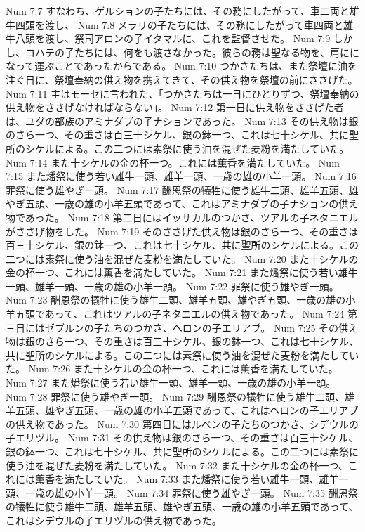 Num 7:7  すなわち、ゲルションの子たちには、その務にしたがって、車二両と雄牛四頭を渡し、
Num 7:8  メラリの子たちには、その務にしたがって車四両と雄牛八頭を渡し、祭司アロンの子イタマルに、これを監督させた。
Num 7:9  しかし、コハテの子たちには、何をも渡さなかった。彼らの務は聖なる物を、肩にになって運ぶことであったからである。
Num 7:10  つかさたちは、また祭壇に油を注ぐ日に、祭壇奉納の供え物を携えてきて、その供え物を祭壇の前にささげた。
Num 7:11  主はモーセに言われた、「つかさたちは一日にひとりずつ、祭壇奉納の供え物をささげなければならない」。
Num 7:12  第一日に供え物をささげた者は、ユダの部族のアミナダブの子ナションであった。
Num 7:13  その供え物は銀のさら一つ、その重さは百三十シケル、銀の鉢一つ、これは七十シケル、共に聖所のシケルによる。この二つには素祭に使う油を混ぜた麦粉を満たしていた。
Num 7:14  また十シケルの金の杯一つ。これには薫香を満たしていた。
Num 7:15  また燔祭に使う若い雄牛一頭、雄羊一頭、一歳の雄の小羊一頭。
Num 7:16  罪祭に使う雄やぎ一頭。
Num 7:17  酬恩祭の犠牲に使う雄牛二頭、雄羊五頭、雄やぎ五頭、一歳の雄の小羊五頭であって、これはアミナダブの子ナションの供え物であった。
Num 7:18  第二日にはイッサカルのつかさ、ツアルの子ネタニエルがささげ物をした。
Num 7:19  そのささげた供え物は銀のさら一つ、その重さは百三十シケル、銀の鉢一つ、これは七十シケル、共に聖所のシケルによる。この二つには素祭に使う油を混ぜた麦粉を満たしていた。
Num 7:20  また十シケルの金の杯一つ、これには薫香を満たしていた。
Num 7:21  また燔祭に使う若い雄牛一頭、雄羊一頭、一歳の雄の小羊一頭。
Num 7:22  罪祭に使う雄やぎ一頭。
Num 7:23  酬恩祭の犠牲に使う雄牛二頭、雄羊五頭、雄やぎ五頭、一歳の雄の小羊五頭であって、これはツアルの子ネタニエルの供え物であった。
Num 7:24  第三日にはゼブルンの子たちのつかさ、ヘロンの子エリアブ。
Num 7:25  その供え物は銀のさら一つ、その重さは百三十シケル、銀の鉢一つ、これは七十シケル、共に聖所のシケルによる。この二つには素祭に使う油を混ぜた麦粉を満たしていた。
Num 7:26  また十シケルの金の杯一つ、これには薫香を満たしていた。
Num 7:27  また燔祭に使う若い雄牛一頭、雄羊一頭、一歳の雄の小羊一頭。
Num 7:28  罪祭に使う雄やぎ一頭。
Num 7:29  酬恩祭の犠牲に使う雄牛二頭、雄羊五頭、雄やぎ五頭、一歳の雄の小羊五頭であって、これはヘロンの子エリアブの供え物であった。
Num 7:30  第四日にはルベンの子たちのつかさ、シデウルの子エリヅル。
Num 7:31  その供え物は銀のさら一つ、その重さは百三十シケル、銀の鉢一つ、これは七十シケル、共に聖所のシケルによる。この二つには素祭に使う油を混ぜた麦粉を満たしていた。
Num 7:32  また十シケルの金の杯一つ、これには薫香を満たしていた。
Num 7:33  また燔祭に使う若い雄牛一頭、雄羊一頭、一歳の雄の小羊一頭。
Num 7:34  罪祭に使う雄やぎ一頭。
Num 7:35  酬恩祭の犠牲に使う雄牛二頭、雄羊五頭、雄やぎ五頭、一歳の雄の小羊五頭であって、これはシデウルの子エリヅルの供え物であった。
